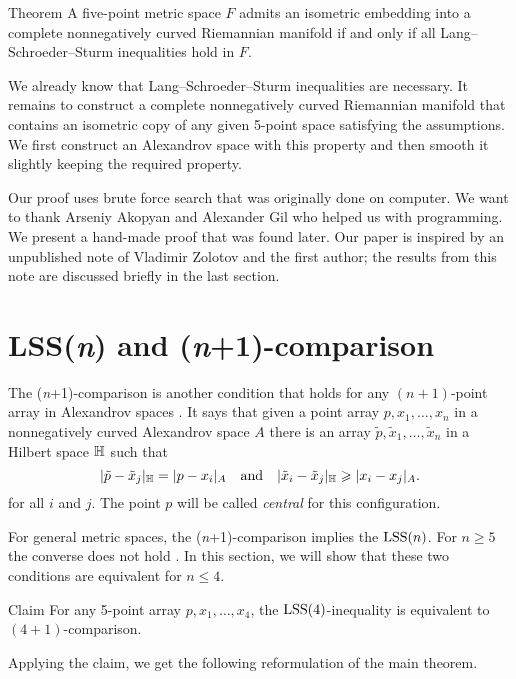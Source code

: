 \documentclass{article}
\begin{document}
\begin{thm}{Theorem}\label{thm:main}
A five-point metric space $F$ admits an isometric embedding into a complete nonnegatively curved Riemannian manifold
if and only if all Lang--Schroeder--Sturm inequalities hold in $F$.
\end{thm}

We already know that Lang--Schroeder--Sturm inequalities are necessary.
It remains to construct a complete nonnegatively curved Riemannian manifold that contains an isometric copy of any given 5-point space satisfying the assumptions.
We first construct an Alexandrov space with this property and then smooth it slightly keeping the required property.

Our proof uses brute force search that was originally done on computer.
We want to thank Arseniy Akopyan and Alexander Gil who helped us with programming.
We present a hand-made proof that was found later.
Our paper is inspired by an unpublished note of Vladimir Zolotov and the first author;
the results from this note are discussed briefly in the last section.


\section{LSS(\textit{n}) and (\textit{n}+1)-comparison}

The (\textit{n}+1)-comparison is another condition that holds for any $(n+1)$-point array in  Alexandrov spaces \cite{alexander2019alexandrov}.
It says that given a point array $p,x_1,\dots,x_n$ in a nonnegatively curved Alexandrov space $A$ 
there is an array $\tilde p,\tilde x_1,\dots,\tilde x_n$ in a Hilbert space $\mathbb H$ such that 
\[
|\tilde p-\tilde x_j|_{\mathbb H}=|p-x_i|_{A}
\quad
\text{and}
\quad
|\tilde x_i-\tilde x_j|_{\mathbb H}\geqslant |x_i-x_j|_{A}.
\]
for all $i$ and $j$.
The point $p$ will be called \emph{central} for this configuration.

For general metric spaces, the (\textit{n}+1)-comparison implies the $\mathrm{LSS}(n)$.
For $n\ge 5$ the converse does not hold \cite[Section 8]{lebedeva-petrunin-zolotov}.
In this section, we will show that these two conditions are equivalent for $n\le 4$.

\begin{thm}{Claim}\label{clm:(4+1)=LSS(4)}
For any 5-point array $p,x_1,\dots,x_4$, the
$\mathrm{LSS}(4)$-inequality is equivalent to $(4+1)$-comparison.
\end{thm}

Applying the claim, we get the following reformulation of the main theorem.
\end{document}
